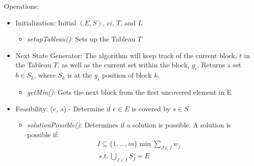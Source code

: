 \documentclass[12pt]{article}
\begin{document}
	Operations:
	\begin{itemize}
		\item Initialization: Initial $(E, S)$, $ci$, $T$, and $L$
		\begin{itemize}
			\item \textit{setupTableau()}: Sets up the Tableau $T$
		\end{itemize}
		\item Next State Generator: The algorithm will keep track of the current block, $t$ in the Tableau $T$, as well as the current set within the block, $g_i$. Returns a set $b \in S_k$, where $S_k$ is at the $g_i$ position of block $k$.
		\begin{itemize}
			\item \textit{getMin()}: Gets the next block from the first uncovered element in E
		\end{itemize}
		\item Feasibility: ($e$, $s$) - Determine if $e \in E$ is covered by $s \in S$ 
		\begin{itemize}
			\item \textit{solutionPossible()}: Determines if a solution is possible. A solution is possible if: \begin{align*}
			I \subseteq \{1,...,m\} \min \sum_{J \in I} w_j \\
			\:s.t.\: \bigcup_{J \in I} S_j = E
			\end{align*}
			

\end{itemize}
\end{itemize}
\end{document}
